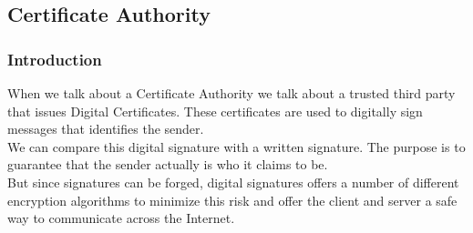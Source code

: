 \subsection{Certificate Authority}
\subsubsection{Introduction}
When we talk about a Certificate Authority we talk about a trusted third party that issues Digital Certificates. These certificates are used to digitally sign messages that identifies the sender.\\
We can compare this digital signature with a written signature. The purpose is to guarantee that the sender actually is who it claims to be.\\
But since signatures can be forged, digital signatures offers a number of different encryption algorithms to minimize this risk and offer the client and server a safe way to communicate across the Internet.
